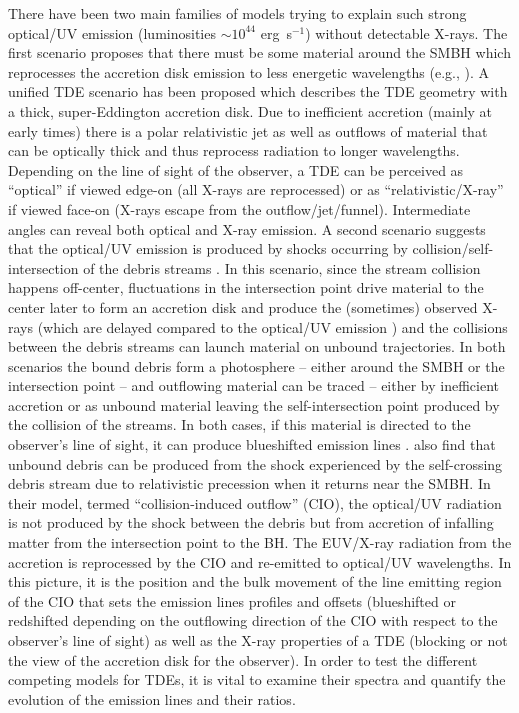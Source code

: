\documentclass[structabstract]{aa}
\begin{document}
There have been two main families of models trying to explain such strong optical/UV emission (luminosities $\sim 10^{44}$ erg~s$^{-1}$) without detectable X-rays. The first scenario proposes that there must be some material around the SMBH which reprocesses the accretion disk emission to less energetic wavelengths (e.g., \citealt{Loeb1997,Strubbe2009,Guillochon2014,Roth2016}). A unified TDE scenario has been proposed \citep{Dai2018} which describes the TDE geometry with a thick, super-Eddington accretion disk. Due to inefficient accretion (mainly at early times) there is a polar relativistic jet as well as outflows of material \citep{Metzger2016} that can be optically thick and thus reprocess radiation to longer wavelengths. Depending on the line of sight of the observer, a TDE can be perceived as ``optical'' if viewed edge-on (all X-rays are reprocessed) or as ``relativistic/X-ray'' if viewed face-on (X-rays escape from the outflow/jet/funnel). Intermediate angles can reveal both optical and X-ray emission. A second scenario suggests that the optical/UV emission is produced by shocks occurring by collision/self-intersection of the debris streams  \citep{Piran2015,Jiang2016}. In this scenario, since the stream collision happens off-center, fluctuations in the intersection point drive material to the center later to form an accretion disk and produce the (sometimes) observed X-rays (which are delayed compared to the optical/UV emission \citealt{Pasham2017}) and the collisions between the debris streams can launch material on unbound trajectories. In both scenarios the bound debris form a photosphere -- either around the SMBH or the intersection point -- and outflowing material can be traced -- either by inefficient accretion or as unbound material leaving the self-intersection point produced by the collision of the streams. In both cases, if this material is directed to the observer's line of sight, it can produce blueshifted emission lines \citep{Nicholl2019}. \citet{Lu2020} also find that unbound debris can be produced from the shock experienced by the self-crossing debris stream due to relativistic precession when it returns near the SMBH. In their model, termed ``collision-induced outflow'' (CIO), the optical/UV radiation is not produced by the shock between the debris but from accretion of infalling matter from the intersection point to the BH. The EUV/X-ray radiation from the accretion is reprocessed by the CIO and re-emitted to optical/UV wavelengths. In this picture, it is the position and the bulk movement of the line emitting region of the CIO that sets the emission lines profiles and offsets (blueshifted or redshifted depending on the outflowing direction of the CIO with respect to the observer's line of sight) as well as the X-ray properties of a TDE (blocking or not the view of the accretion disk for the observer). In order to test the different competing models for TDEs, it is vital to examine their spectra and quantify the evolution of the emission lines and their ratios.
\end{document}
